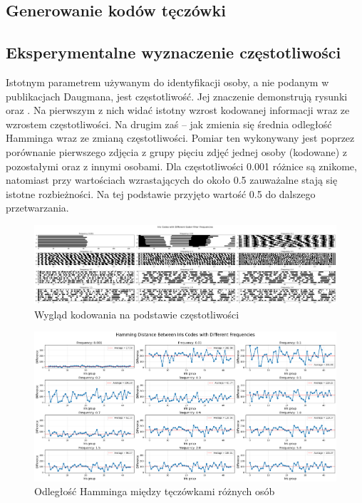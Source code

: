 \documentclass[a4paper]{article}
\begin{document}
\subsection*{Generowanie kodów tęczówki}

\subsection*{Eksperymentalne wyznaczenie częstotliwości}

Istotnym parametrem używanym do identyfikacji osoby, a nie podanym w publikacjach Daugmana, jest częstotliwość. Jej znaczenie demonstrują rysunki  oraz . Na pierwszym z nich widać istotny wzrost kodowanej informacji wraz ze wzrostem częstotliwości. Na drugim zaś – jak zmienia się średnia odległość Hamminga wraz ze zmianą częstotliwości. Pomiar ten wykonywany jest poprzez porównanie pierwszego zdjęcia z grupy pięciu zdjęć jednej osoby (kodowane) z pozostałymi oraz z innymi osobami. Dla częstotliwości 0.001 różnice są znikome, natomiast przy wartościach wzrastających do około 0.5 zauważalne stają się istotne rozbieżności. Na tej podstawie przyjęto wartość 0.5 do dalszego przetwarzania.

\begin{figure}[H]
    \centering
    \includegraphics[width=1\linewidth]{figures/waznosc_freq_1.png}
    \caption{Wygląd kodowania na podstawie częstotliwości}
    \label{fig:wpływ_freq_1}
\end{figure}

\begin{figure}[H]
    \centering
    \includegraphics[width=1\linewidth]{figures/waznosc_freq_2.png}
    \caption{Odległość Hamminga między tęczówkami różnych osób}
    \label{fig:wpływ_freq_2}
\end{figure}
\end{document}
